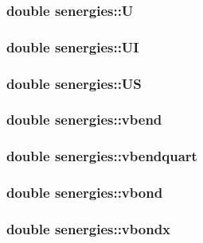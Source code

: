 \subsubsection{\setlength{\rightskip}{0pt plus 5cm}double {\bf senergies::U}}\label{structsenergies_e49a42f164b40c22de8f6f733363195e}


\subsubsection{\setlength{\rightskip}{0pt plus 5cm}double {\bf senergies::UI}}\label{structsenergies_a6c1a0d4c91e03857cdd4ac2814d4ebe}


\subsubsection{\setlength{\rightskip}{0pt plus 5cm}double {\bf senergies::US}}\label{structsenergies_90cae4b4cbd12c29b511e10b7089d01a}


\subsubsection{\setlength{\rightskip}{0pt plus 5cm}double {\bf senergies::vbend}}\label{structsenergies_f2411322eb16d4f957501e0a66c2e7f5}


\subsubsection{\setlength{\rightskip}{0pt plus 5cm}double {\bf senergies::vbendquart}}\label{structsenergies_7d38de38f26985197699cb309397851e}


\subsubsection{\setlength{\rightskip}{0pt plus 5cm}double {\bf senergies::vbond}}\label{structsenergies_ebd310e137b101d92b26898e3cc319e5}


\subsubsection{\setlength{\rightskip}{0pt plus 5cm}double {\bf senergies::vbondx}}\label{structsenergies_b18b28c76c89e882a07d44f237e47394}



